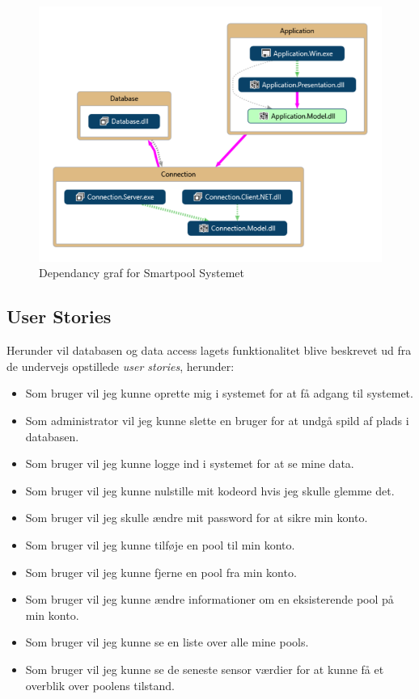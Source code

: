 \begin{figure}[h]
	\centering
	\includegraphics[width=0.8\linewidth]{figs/design/vs_codeMap.PNG}
	\caption{Dependancy graf for Smartpool Systemet}
	\label{fig:vs_codeMap}
\end{figure}

\subsection{User Stories}
Herunder vil databasen og data access lagets funktionalitet blive beskrevet ud fra de undervejs opstillede \textit{user stories}, herunder:

\begin{itemize}
	\item Som bruger vil jeg kunne oprette mig i systemet for at få adgang til systemet.
	\item Som administrator vil jeg kunne slette en bruger for at undgå spild af plads i databasen.
	\item Som bruger vil jeg kunne logge ind i systemet for at se mine data.
	\item Som bruger vil jeg kunne nulstille mit kodeord hvis jeg skulle glemme det.
	\item Som bruger vil jeg skulle ændre mit password for at sikre min konto.
	\item Som bruger vil jeg kunne tilføje en pool til min konto.
	\item Som bruger vil jeg kunne fjerne en pool fra min konto.
	\item Som bruger vil jeg kunne ændre informationer om en eksisterende pool på min konto.
	\item Som bruger vil jeg kunne se en liste over alle mine pools.
	\item Som bruger vil jeg kunne se de seneste sensor værdier for at kunne få et overblik over poolens tilstand.
\end{itemize}

